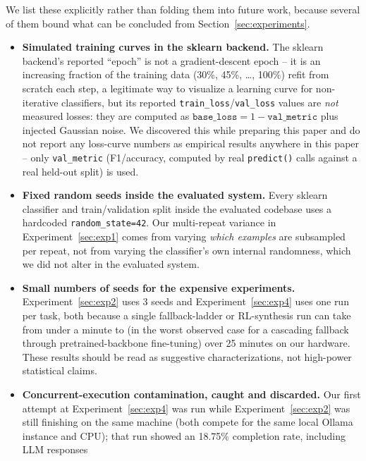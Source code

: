 \documentclass[10pt,twocolumn]{article}
\begin{document}
We list these explicitly rather than folding them into future work, because
several of them bound what can be concluded from Section~\ref{sec:experiments}.

\begin{itemize}
  \item \textbf{Simulated training curves in the sklearn backend.} The
        sklearn backend's reported ``epoch'' is not a gradient-descent
        epoch -- it is an increasing fraction of the training data
        (30\%, 45\%, \ldots, 100\%) refit from scratch each step, a
        legitimate way to visualize a learning curve for non-iterative
        classifiers, but its reported \texttt{train\_loss}/\texttt{val\_loss}
        values are \emph{not} measured losses: they are computed as
        $\texttt{base\_loss} = 1 - \texttt{val\_metric}$ plus injected
        Gaussian noise. We discovered this while preparing this paper and
        do not report any loss-curve numbers as empirical results anywhere
        in this paper -- only \texttt{val\_metric} (F1/accuracy, computed
        by real \texttt{predict()} calls against a real held-out split) is
        used.
  \item \textbf{Fixed random seeds inside the evaluated system.} Every
        sklearn classifier and train/validation split inside the evaluated
        codebase uses a hardcoded \texttt{random\_state=42}. Our
        multi-repeat variance in Experiment~\ref{sec:exp1} comes from
        varying \emph{which examples} are subsampled per repeat, not from
        varying the classifier's own internal randomness, which we did not
        alter in the evaluated system.
  \item \textbf{Small numbers of seeds for the expensive experiments.}
        Experiment~\ref{sec:exp2} uses 3 seeds and
        Experiment~\ref{sec:exp4} uses one run per task, both because a
        single fallback-ladder or RL-synthesis run can take from under a
        minute to (in the worst observed case for a cascading fallback
        through pretrained-backbone fine-tuning) over 25 minutes on our
        hardware. These results should be read as suggestive
        characterizations, not high-power statistical claims.
  \item \textbf{Concurrent-execution contamination, caught and discarded.}
        Our first attempt at Experiment~\ref{sec:exp4} was run while
        Experiment~\ref{sec:exp2} was still finishing on the same machine
        (both compete for the same local Ollama instance and CPU); that run
        showed an 18.75\% completion rate, including LLM responses

\end{itemize}
\end{document}
